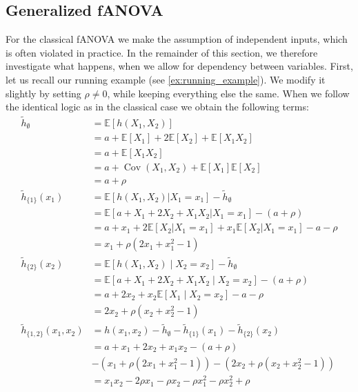 \subsection{Generalized fANOVA}
For the classical fANOVA we make the assumption of independent inputs, which is often violated in practice. In the remainder of this section, we therefore investigate what happens, when we allow for dependency between variables.
First, let us recall our running example (see \autoref{ex:running_example}). We modify it slightly by setting $\rho\neq 0$, while keeping everything else the same. When we follow the identical logic as in the classical case we obtain the following terms:
\begin{align*}
\tilde{h}_{\emptyset}
  &= \mathbb{E}[h(X_1, X_2)] \\[0.3em]
  &= a + \mathbb{E}[X_1] + 2\mathbb{E}[X_2] + \mathbb{E}[X_1 X_2] \\[0.3em]
  &= a + \mathbb{E}[X_1 X_2]  \\[0.3em]
  &= a + \operatorname{Cov}(X_1,X_2) + \mathbb{E}[X_1]\mathbb{E}[X_2] \\[0.3em]
  &= a + \rho\\[0.5em]
\tilde{h}_{\{1\}}(x_1) 
&= \mathbb{E}[h(X_1, X_2) | X_1 = x_1] - \tilde{h}_{\emptyset} \\[0.3em]
&= \mathbb{E}[a + X_1 + 2X_2 + X_1 X_2 | X_1 = x_1] - (a + \rho) \\[0.3em]
&= a + x_1 + 2\mathbb{E}[X_2 | X_1 = x_1] + x_1 \mathbb{E}[X_2 | X_1 = x_1] - a - \rho \\[0.3em]
&= x_1 + \rho(2x_1 + x_1^2 - 1) \\[0.5em]
\tilde{h}_{\{2\}}(x_2) 
&= \mathbb{E}[h(X_1, X_2) \mid X_2 = x_2] - \tilde{h}_{\emptyset} \\[0.3em]
&= \mathbb{E}[a + X_1 + 2X_2 + X_1 X_2 \mid X_2 = x_2] - (a + \rho) \\[0.3em]
&= a + 2x_2 + x_2 \mathbb{E}[X_1 \mid X_2 = x_2] - a - \rho \\[0.3em]
&= 2x_2 + \rho(x_2 + x_2^2 - 1) \\[0.5em]
\tilde{h}_{\{1,2\}}(x_1, x_2) 
&= h(x_1, x_2) - \tilde{h}_{\emptyset} - \tilde{h}_{\{1\}}(x_1) - \tilde{h}_{\{2\}}(x_2) \\[0.3em]
&= a + x_1 + 2x_2 + x_1 x_2 - (a + \rho) \\[0.3em]
&- (x_1 + \rho(2x_1 + x_1^2 - 1)) - (2x_2 + \rho(x_2 + x_2^2 - 1))\\[0.3em]
&= x_1 x_2 - 2\rho x_1 - \rho x_2  - \rho x_1^2  - \rho x_2^2 + \rho
\end{align*}
